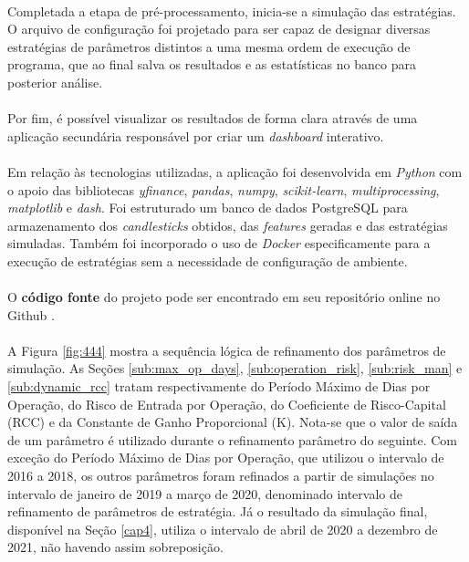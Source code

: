 \paragraph{} Completada a etapa de pré-processamento, inicia-se a simulação das estratégias. O arquivo de configuração foi projetado para ser capaz de designar diversas estratégias de parâmetros distintos a uma mesma ordem de execução de programa, que ao final salva os resultados e as estatísticas no banco para posterior análise.

\paragraph{} Por fim, é possível visualizar os resultados de forma clara através de uma aplicação secundária responsável por criar um \textit{dashboard} interativo.

\paragraph{} Em relação às tecnologias utilizadas, a aplicação foi desenvolvida em \textit{Python} com o apoio das bibliotecas \textit{yfinance}, \textit{pandas}, \textit{numpy}, \textit{scikit-learn}, \textit{multiprocessing}, \textit{matplotlib} e \textit{dash}. Foi estruturado um banco de dados PostgreSQL \cite{postgresql} para armazenamento dos \textit{candlesticks} obtidos, das \textit{features} geradas e das estratégias simuladas. Também foi incorporado o uso de \textit{Docker} especificamente para a execução de estratégias sem a necessidade de configuração de ambiente.

\paragraph{} O \textbf{código fonte} do projeto pode ser encontrado em seu repositório online no Github \cite{project_github}.

\paragraph{} A Figura \ref{fig:444} mostra a sequência lógica de refinamento dos parâmetros de simulação. As Seções \ref{sub:max_op_days}, \ref{sub:operation_risk}, \ref{sub:risk_man} e \ref{sub:dynamic_rcc} tratam respectivamente do Período Máximo de Dias por Operação, do Risco de Entrada por Operação, do Coeficiente de Risco-Capital (RCC) e da Constante de Ganho Proporcional (K). Nota-se que o valor de saída de um parâmetro é utilizado durante o refinamento parâmetro do seguinte. Com exceção do Período Máximo de Dias por Operação, que utilizou o intervalo de 2016 a 2018, os outros parâmetros foram refinados a partir de simulações no intervalo de janeiro de 2019 a março de 2020, denominado intervalo de refinamento de parâmetros de estratégia. Já o resultado da simulação final, disponível na Seção \ref{cap4}, utiliza o intervalo de abril de 2020 a dezembro de 2021, não havendo assim sobreposição.

